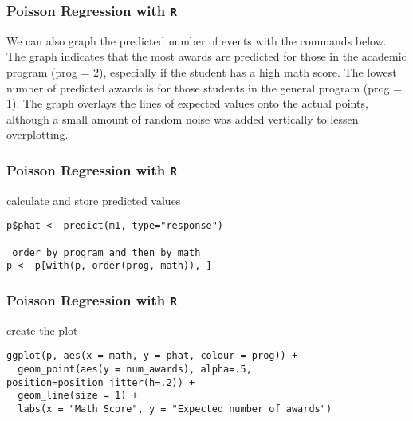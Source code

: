 \documentclass[00-GLMregslides.tex]{subfiles}
\begin{document}
\begin{frame}[fragile]

\frametitle{Poisson Regression with \texttt{R}}
\Large


We can also graph the predicted number of events with the commands below. The graph indicates that the most awards are predicted for those in the academic program (prog = 2), especially if the student has a high math score. The lowest number of predicted awards is for those students in the general program (prog = 1). The graph overlays the lines of expected values onto the actual points, although a small amount of random noise was added vertically to lessen overplotting.

\end{frame}

\begin{frame}[fragile]

\frametitle{Poisson Regression with \texttt{R}}
\Large

 calculate and store predicted values

\begin{framed}
\begin{verbatim}
p$phat <- predict(m1, type="response")

 order by program and then by math
p <- p[with(p, order(prog, math)), ]
\end{verbatim}
\end{framed}
\end{frame}
\begin{frame}[fragile]

\frametitle{Poisson Regression with \texttt{R}}
\Large

 create the plot

\begin{framed}
\begin{verbatim}
ggplot(p, aes(x = math, y = phat, colour = prog)) +
  geom_point(aes(y = num_awards), alpha=.5, position=position_jitter(h=.2)) +
  geom_line(size = 1) +
  labs(x = "Math Score", y = "Expected number of awards")
\end{verbatim}
\end{framed}
\end{frame}
\end{document}
